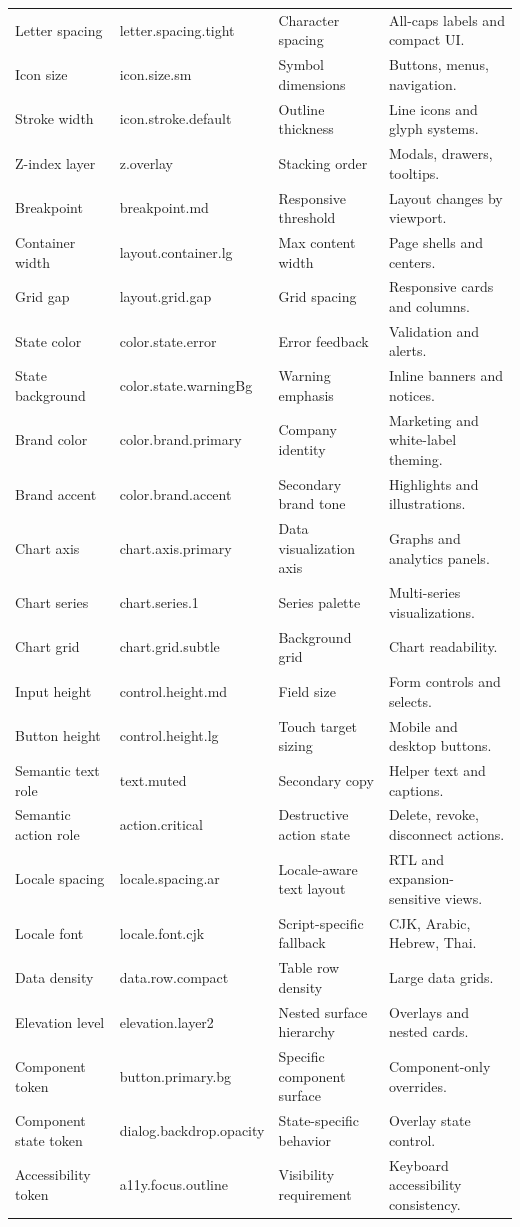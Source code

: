 \begin{longtable}{@{}p{}p{}p{}p{}@{}}
Letter spacing & letter.spacing.tight & Character spacing & All-caps labels and compact UI. \\
Icon size & icon.size.sm & Symbol dimensions & Buttons, menus, navigation. \\
Stroke width & icon.stroke.default & Outline thickness & Line icons and glyph systems. \\
Z-index layer & z.overlay & Stacking order & Modals, drawers, tooltips. \\
Breakpoint & breakpoint.md & Responsive threshold & Layout changes by viewport. \\
Container width & layout.container.lg & Max content width & Page shells and centers. \\
Grid gap & layout.grid.gap & Grid spacing & Responsive cards and columns. \\
State color & color.state.error & Error feedback & Validation and alerts. \\
State background & color.state.warningBg & Warning emphasis & Inline banners and notices. \\
Brand color & color.brand.primary & Company identity & Marketing and white-label theming. \\
Brand accent & color.brand.accent & Secondary brand tone & Highlights and illustrations. \\
Chart axis & chart.axis.primary & Data visualization axis & Graphs and analytics panels. \\
Chart series & chart.series.1 & Series palette & Multi-series visualizations. \\
Chart grid & chart.grid.subtle & Background grid & Chart readability. \\
Input height & control.height.md & Field size & Form controls and selects. \\
Button height & control.height.lg & Touch target sizing & Mobile and desktop buttons. \\
Semantic text role & text.muted & Secondary copy & Helper text and captions. \\
Semantic action role & action.critical & Destructive action state & Delete, revoke, disconnect actions. \\
Locale spacing & locale.spacing.ar & Locale-aware text layout & RTL and expansion-sensitive views. \\
Locale font & locale.font.cjk & Script-specific fallback & CJK, Arabic, Hebrew, Thai. \\
Data density & data.row.compact & Table row density & Large data grids. \\
Elevation level & elevation.layer2 & Nested surface hierarchy & Overlays and nested cards. \\
Component token & button.primary.bg & Specific component surface & Component-only overrides. \\
Component state token & dialog.backdrop.opacity & State-specific behavior & Overlay state control. \\
Accessibility token & a11y.focus.outline & Visibility requirement & Keyboard accessibility consistency. \\
\end{longtable}

